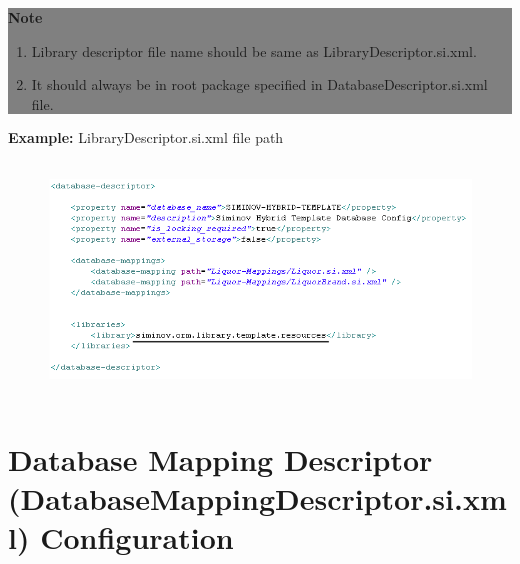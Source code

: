 	\begin{center}
		\colorbox{grey}{
			\parbox[t]{.8\linewidth}{
				\fontsize{11pt}{11pt}\selectfont %
				\vspace*{0.1cm} %
		
				\hfill \textbf{Note} \\

				\hfill 

				\begin{enumerate}

					\item \small Library descriptor file name should be same as LibraryDescriptor.si.xml.

					\item \small It should always be in root package specified in DatabaseDescriptor.si.xml file.
	
				\end{enumerate}

				\vspace*{0.0cm} %
			}
		}

\end{center}



		\par
		\textbf{Example:} LibraryDescriptor.si.xml file path
		\begin{figure}[htbp]
			\centering
				\includegraphics[height=6.2cm]{Resources/siminov_library_template_path_example.png}
		\end{figure}



\newpage
\section{Database Mapping Descriptor (DatabaseMappingDescriptor.si.xml) Configuration}
	

